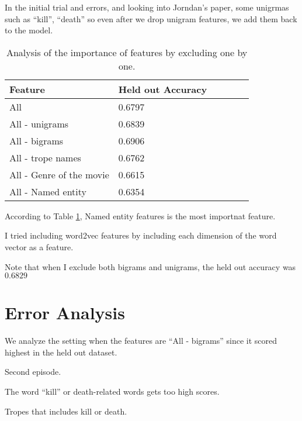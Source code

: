 \documentclass[11pt]{article}
\begin{document}
In the initial trial and errors, and looking into Jorndan's paper, some unigrmas such as ``kill'', ``death'' so even after we drop unigram features, we add them back to the model.

\begin{table}[h]
  \centering
  \begin{tabular}{|l|l|r|r|r|r|}
  \hline \bf Feature        & \bf Held out Accuracy     \\ \hline
   All                      & 0.6797 \\ \hline
   All - unigrams           & 0.6839 \\ \hline
   All - bigrams            & 0.6906 \\ \hline
   All - trope names        & 0.6762 \\ \hline
   All - Genre of the movie & 0.6615 \\ \hline
   All - Named entity       & 0.6354 \\ \hline
  \end{tabular}
  \caption{\label{feature_importance}Analysis of the importance of features by excluding one by one.}
\end{table}

According to Table \ref{feature_importance}, Named entity features is the most importnat feature. 

I tried including word2vec features by including each dimension of the word vector as a feature. 

Note that when I exclude both bigrams and unigrams, the held out accuracy was $0.6829$ 

\section{Error Analysis}

We analyze the setting when the features are ``All - bigrams'' since it scored highest in the held out dataset.

Second episode.

The word ``kill'' or death-related words gets too high scores. 

Tropes that includes kill or death.
\end{document}
